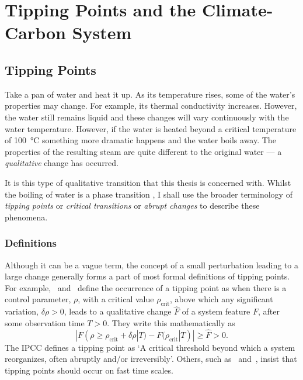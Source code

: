 \chapter{Tipping Points and the Climate-Carbon System}
\graphicspath{{introduction1/figs}}
\label{sec:intro1}

\section{Tipping Points}
Take a pan of water and heat it up. As its temperature rises, some of the water's properties may change. For example, its thermal conductivity increases.
However, the water still remains liquid and these changes will vary continuously with the water temperature. However, if the water is heated beyond
a critical temperature of \SI{100}{\degreeCelsius} something more dramatic happens and the water boils away. The properties of the resulting steam are quite different
to the original water --- a \emph{qualitative} change has occurred.

It is this type of qualitative transition that this thesis is concerned with. Whilst the boiling of water is a phase transition \parencite{Goldenfeld1992}, I shall use the broader terminology
of \emph{tipping points} \parencite{Lenton2008} or \emph{critical transitions} \parencite{Rahmstorf1995} or \emph{abrupt changes} \parencite{Alley2003} to describe these phenomena. 

\subsection{Definitions}

Although it can be a vague term, the concept of a small perturbation leading to a large change generally forms a part of most formal definitions of tipping points.
For example,~\cite{Lenton2008} and~\cite{ArmstrongMcKay2022} define the occurrence of a tipping
point as when there is a control parameter, $\rho$, with a critical value $\rho_{\mathrm{crit}}$, above which any significant variation, $\delta \rho > 0$,
leads to a qualitative change $\hat{F}$ of a system feature $F$, after some observation time $T > 0$. They write this mathematically as
\begin{equation}
  \label{eq:lenton_tipping_definition}
  |F(\rho \geq \rho_{\mathrm{crit}} + \delta \rho | T) - F(\rho_{\mathrm{crit}} | T)| \geq \hat{F} > 0.
\end{equation}
The IPCC \parencite{AR6} defines a tipping point as `A critical threshold beyond which a system reorganizes, often abruptly and/or irreversibly'. Others,
such as~\cite{Wang2023} and~\cite{Kopp2016}, insist that tipping points should occur on fast time scales.

